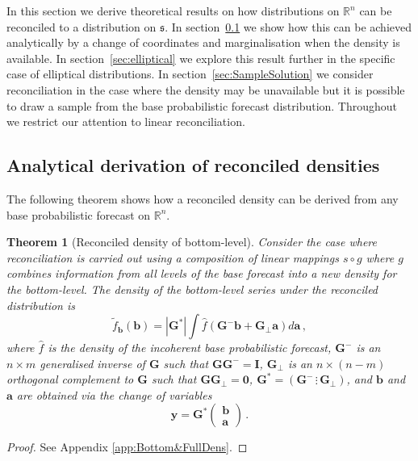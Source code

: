 \documentclass[12pt]{article}
\newtheorem{theo}{Theorem}[section]
\theoremstyle{definition}
\begin{document}
In this section we derive theoretical results on how distributions on $\mathbb{R}^n$ can be reconciled to a distribution on $\mathfrak{s}$.  In section~\ref{sec:andens} we show how this can be achieved analytically by a change of coordinates and marginalisation when the density is available.  In section~\ref{sec:elliptical} we explore this result further in the specific case of elliptical distributions. In section~\ref{sec:SampleSolution} we consider reconciliation in the case where the density may be unavailable but it is possible to draw a sample from the base probabilistic forecast distribution.  Throughout we restrict our attention to linear reconciliation. 

\subsection{Analytical derivation of reconciled densities}\label{sec:andens}

The following theorem shows how a reconciled density can be derived from any base probabilistic forecast on $\mathbb{R}^n$.

\begin{theo}[Reconciled density of bottom-level]\label{theo:bottomdens}
	Consider the case where reconciliation is carried out using a composition of linear mappings $s\circ g$ where $g$ combines information from all levels of the base forecast into a new density for the bottom-level.  The density of the bottom-level series under the reconciled distribution is
	\[
	\tilde{f}_{\bm{b}}(\bm{b})=|\bm{G^*}|\int \hat{f}(\bm{G}^{-}{\bm b}+\bm{G}_\perp {\bm a})d\bm{a}\,,
	\]
	where $\hat{f}$ is the density of the incoherent base probabilistic forecast, $\bm{G^-}$ is an $n\times m$ generalised inverse of $\bm{G}$ such that $\bm{G}\bm{G}^-=\bm{I}$, $\bm{G_\perp}$ is an $n\times (n-m)$ orthogonal complement to $\bm{G}$ such that $\bm{G}\bm{G}_\perp=\bm{0}$, $\bm{G^*}=\left(\bm{G}^-\,\vdots\,\bm{G}_\perp\right)$, and $\bm{b}$ and $\bm{a}$ are obtained via the change of variables
	\[
	\bm{y}=\bm{G^*}\begin{pmatrix}\bm{b}\\\bm{a}\end{pmatrix}\,.
	\]
\end{theo}

\begin{proof}
	See Appendix \ref{app:Bottom&FullDens}.
\end{proof}
\end{document}

